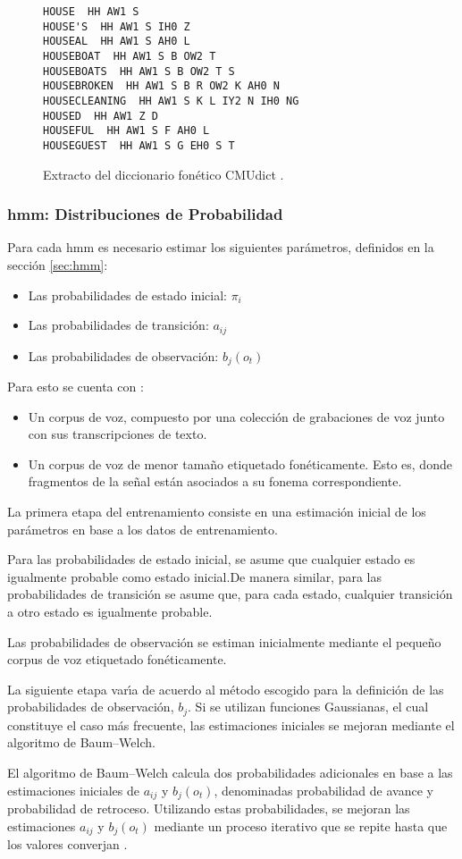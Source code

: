 \begin{figure}[H]
\begin{lstlisting}
HOUSE  HH AW1 S
HOUSE'S  HH AW1 S IH0 Z
HOUSEAL  HH AW1 S AH0 L
HOUSEBOAT  HH AW1 S B OW2 T
HOUSEBOATS  HH AW1 S B OW2 T S
HOUSEBROKEN  HH AW1 S B R OW2 K AH0 N
HOUSECLEANING  HH AW1 S K L IY2 N IH0 NG
HOUSED  HH AW1 Z D
HOUSEFUL  HH AW1 S F AH0 L
HOUSEGUEST  HH AW1 S G EH0 S T
\end{lstlisting}
\caption{Extracto del diccionario fon\'etico CMUdict \cite{CMUdict}.}
\end{figure}

\subsubsection{\gls{hmm}: Distribuciones de Probabilidad}
Para cada \gls{hmm} es necesario estimar los siguientes par\'ametros, definidos en la secci\'on \ref{sec:hmm}:
	\begin{itemize}
		\item Las probabilidades de estado inicial: $\pi_i$
		\item Las probabilidades de transici\'on: $a_{ij}$
		\item Las probabilidades de observaci\'on: $b_j(o_t)$ 
	\end{itemize}

Para esto se cuenta con \cite{Jurafsky}:
	\begin{itemize}
		\item  Un corpus de voz, compuesto por una colecci\'on de grabaciones de voz junto
		con sus transcripciones de texto.
		\item Un corpus de voz de menor tama\~no etiquetado fon\'eticamente. 
		Esto es, donde fragmentos de la se\~nal est\'an asociados a su fonema correspondiente.
	\end{itemize}

La primera etapa del entrenamiento consiste en una estimaci\'on inicial de los par\'ametros en base a los
datos de entrenamiento.

Para las probabilidades de estado inicial, se asume que cualquier estado es igualmente probable 
como estado inicial.De manera similar, para las probabilidades de transici\'on se asume que, para cada estado, cualquier transici\'on a otro estado es igualmente probable.

Las probabilidades de observaci\'on se estiman inicialmente mediante el peque\~no corpus 
de voz etiquetado fon\'eticamente.

La siguiente etapa var{\'\i}a de acuerdo al m\'etodo escogido para la definici\'on de las probabilidades
de observaci\'on, $b_j$. Si se utilizan funciones Gaussianas, el cual constituye el caso m\'as
frecuente, las estimaciones iniciales se mejoran mediante el algoritmo de Baum--Welch.

El algoritmo de Baum--Welch calcula dos probabilidades adicionales en base a las estimaciones
iniciales de $a_{ij}$ y $b_j(o_t)$, denominadas probabilidad de avance y probabilidad de retroceso. 
Utilizando estas probabilidades, se mejoran las estimaciones $a_{ij}$ y $b_j(o_t)$ mediante
un proceso iterativo que se repite hasta que los valores converjan \cite{Rabiner89atutorial}.